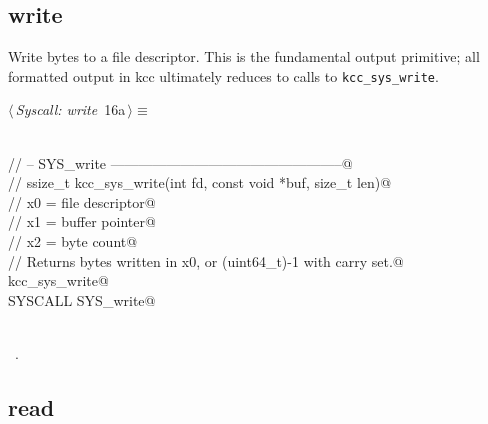 \documentclass[11pt,a4paper,twoside,openright,DIV=15]{scrbook}
\theoremstyle{definition}
\theoremstyle{plain}
\theoremstyle{remark}
\newcommand{\kcc}{\textsf{kcc}}
\begin{document}
\subsection{write}

Write bytes to a file descriptor.  This is the fundamental output
primitive; all formatted output in \kcc{} ultimately reduces to
calls to \texttt{kcc\_sys\_write}.

\begin{flushleft} \small
\begin{minipage}{\linewidth}\label{scrap4}\raggedright\small
{} $\langle\,${\itshape Syscall: write}\nobreak\ {\footnotesize {16a}}$\,\rangle\equiv$
\vspace{-1ex}
\begin{list}{}{} \item
\mbox{}\verb@@\\
\mbox{}\verb@// -- SYS_write --------------------------------------------------@\\
\mbox{}\verb@// ssize_t kcc_sys_write(int fd, const void *buf, size_t len)@\\
\mbox{}\verb@//   x0 = file descriptor@\\
\mbox{}\verb@//   x1 = buffer pointer@\\
\mbox{}\verb@//   x2 = byte count@\\
\mbox{}\verb@// Returns bytes written in x0, or (uint64_t)-1 with carry set.@\\
\mbox{}\verb@FUNC kcc_sys_write@\\
\mbox{}\verb@    SYSCALL SYS_write@\\
\mbox{}\verb@ENDFUNC@\\
\mbox{}\verb@@{\NWsep}
\end{list}
\vspace{-1.5ex}
\footnotesize
\begin{list}{}{\setlength{\itemsep}{-\parsep}\setlength{\itemindent}{-\leftmargin}}
\item \NWtxtMacroRefIn\ .

\item{}
\end{list}
\end{minipage}\vspace{4ex}
\end{flushleft}
\subsection{read}
\end{document}
